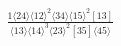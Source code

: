 \documentclass[varwidth, border=5pt]{standalone}
\begin{document}
\begin{my}
$\begin{gathered}
\scriptscriptstyle\frac{1⟨24⟩⟨12⟩^2⟨34⟩⟨15⟩^2[13]}{⟨13⟩⟨14⟩^3⟨23⟩^2[35]⟨45⟩}
\end{gathered}$
\end{my}
\end{document}
